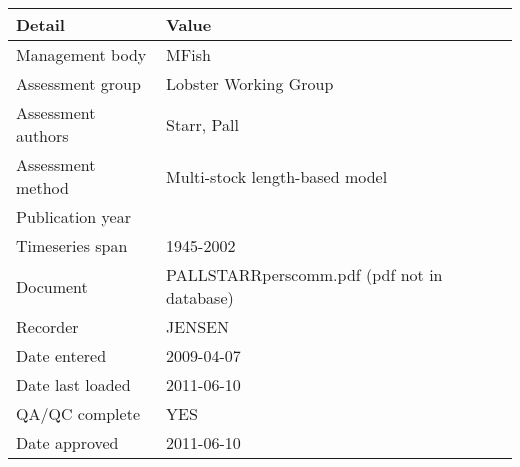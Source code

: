 \begin{table}[htb]
\centering
\begin{tabular}{ll}
\toprule
Detail & Value \\
\midrule
Management body    & MFish                                       \\
Assessment group   & Lobster Working Group                       \\
Assessment authors & Starr, Pall                                 \\
Assessment method  & Multi-stock length-based model              \\
Publication year   &                                             \\
Timeseries span    & 1945-2002                                   \\
Document           & PALLSTARRperscomm.pdf (pdf not in database) \\
Recorder           & JENSEN                                      \\
Date entered       & 2009-04-07                                  \\
Date last loaded   & 2011-06-10                                  \\
QA/QC complete     & YES                                         \\
Date approved      & 2011-06-10                                  \\
\bottomrule
\end{tabular}
\label{tab:assessdet}
\end{table}
